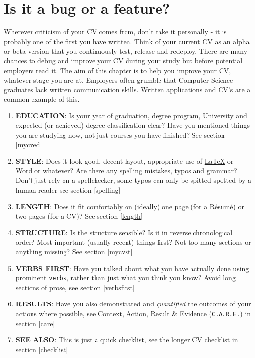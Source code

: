 \documentclass[
]{book}
\providecommand{\tightlist}{%
  \setlength{\itemsep}{0pt}\setlength{\parskip}{0pt}}
\begin{document}
\hypertarget{mycv}{%
\section{Is it a bug or a feature?}\label{mycv}}

Wherever criticism of your CV comes from, don't take it personally - it is probably one of the first you have written. Think of your current CV as an alpha or beta version that you continuously test, release and redeploy. There are many chances to debug and improve your CV during your study but before potential employers read it. The aim of this chapter is to help you improve your CV, whatever stage you are at. Employers often grumble that Computer Science graduates lack written communication skills. Written applications and CV's are a common example of this.

\begin{enumerate}
\def\labelenumi{\arabic{enumi}.}
\tightlist
\item
  \textbf{EDUCATION}: Is your year of graduation, degree program, University and expected (or achieved) degree classification clear? Have you mentioned things you are studying now, not just courses you have finished? See section \ref{mycved}
\item
  \textbf{STYLE}: Does it look good, decent layout, appropriate use of \href{https://latex4year1.netlify.app/}{LaTeX} or Word or whatever? \citep{latex4year1} Are there any spelling mistakes, typos and grammar? Don't just rely on a spellchecker, some typos can only be \sout{spitted} spotted by a human reader see section \ref{spelling}
\item
  \textbf{LENGTH}: Does it fit comfortably on (ideally) one page (for a Résumé) or two pages (for a CV)? See section \ref{length}
\item
  \textbf{STRUCTURE}: Is the structure sensible? Is it in reverse chronological order? Most important (usually recent) things first? Not too many sections or anything missing? See section \ref{mycvst}
\item
  \textbf{VERBS FIRST}: Have you talked about what you have actually done using prominent \texttt{verbs}, rather than just what you think you know? Avoid long sections of \href{https://en.wikipedia.org/wiki/Prose}{prose}, see section \ref{verbsfirst}
\item
  \textbf{RESULTS}: Have you also demonstrated and \emph{quantified} the outcomes of your actions where possible, see Context, Action, Result \& Evidence (\texttt{C.A.R.E.}) in section \ref{care}
\item
  \textbf{SEE ALSO}: This is just a quick checklist, see the longer CV checklist in section \ref{checklist}
\end{enumerate}
\end{document}
